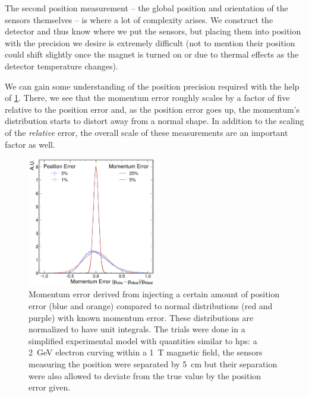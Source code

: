 The second position measurement -- the global position and orientation of the sensors themselves
-- is where a lot of complexity arises.
We construct the detector and thus know where we put the sensors, but placing
them into position with the precision we desire is extremely difficult (not to mention their
position could shift slightly once the magnet is turned on or due to thermal effects as
the detector temperature changes).

We can gain some understanding of the position precision required with the help of
\cref{fig:momentum-error-from-position-error}. There, we see that the momentum error roughly scales
by a factor of five relative to the position error and, as the position error goes up, the
momentum's distribution starts to distort away from a normal shape. In addition to the scaling of
the \emph{relative} error, the overall scale of these measurements are an important factor as well.

\begin{figure}
  \centering
  \includegraphics[width=0.5\textwidth]{one-offs/position-momentum-uncertainty/momentum-error-from-position-error.pdf}
  \caption{
    Momentum error derived from injecting a certain amount of position error
    (blue and orange) compared to normal distributions (red and purple)
    with known momentum error.
    These distributions are normalized to have unit integrals.
    The trials were done in a simplified experimental model with quantities
    similar to \ac{hps}: a \qty{2}{\giga\electronvolt} electron curving within a
    \qty{1}{\tesla} magnetic field, the sensors measuring the position were
    separated by \qty{5}{\centi\meter} but their separation were also allowed to
    deviate from the true value by the position error given.
  }
  \label{fig:momentum-error-from-position-error}
\end{figure}

